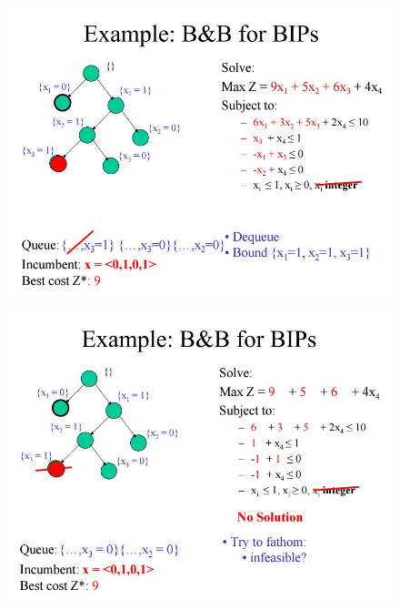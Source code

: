 \documentclass{beamer}
\begin{document}
\begin{frame}
	\begin{figure}
		\centering
		\includegraphics[width=1.0\linewidth]{BB-BIP/BB-BIP19}
	\end{figure}
\end{frame}
\begin{frame}
	\begin{figure}
		\centering
		\includegraphics[width=1.1\linewidth]{BB-BIP/BB-BIP20}
	\end{figure}
\end{frame}
\end{document}
